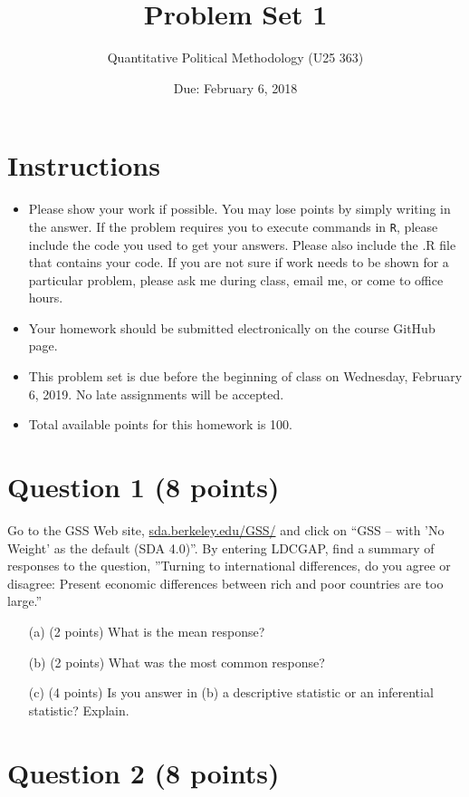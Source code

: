 \documentclass[12pt,letterpaper]{article}
\title{Problem Set 1}
\date{Due: February 6, 2018}
\author{Quantitative Political Methodology (U25 363)}
\begin{document}
	\maketitle
	
	\section*{Instructions}
	\begin{itemize}
		\item Please show your work if possible. You may lose points by simply writing in the answer. If the problem requires you to execute commands in \texttt{R}, please include the code you used to get your answers. Please also include the .R file that contains your code. If you are not sure if work needs to be shown for a particular problem, please ask me during class, email me, or come to office hours.
		\item Your homework should be submitted electronically on the course GitHub page.
		\item This problem set is due before the beginning of class on Wednesday, February 6, 2019. No late assignments will be accepted.
		\item Total available points for this homework is 100.
	\end{itemize}
	
	
	\section*{Question 1 (8 points)}
	
	Go to the GSS Web site,  \href{http://sda.berkeley.edu/GSS/}{sda.berkeley.edu/GSS/} and click on “GSS – with ’No Weight’ as the default (SDA 4.0)”. By entering LDCGAP, find a summary of responses to the question, ”Turning to international differences, do you agree or disagree: Present economic differences between rich and poor countries are too large.”
	\begin{itemize}
		\item[(a)] (2 points) What is the mean response?
		\item[(b)] (2 points) What was the most common response?
		\item[(c)] (4 points) Is you answer in (b) a descriptive statistic or an inferential statistic? Explain.
	\end{itemize}
	
	\section*{Question 2 (8 points)}
	
\end{document}
